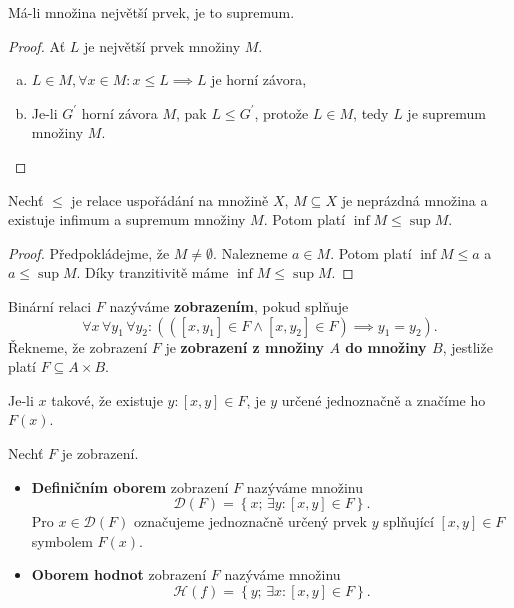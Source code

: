 \begin{poznamka}
	Má-li množina největší prvek, je to supremum.
\end{poznamka}

\begin{proof}
	Ať $L$ je největší prvek množiny $M$.
	\begin{enumerate}[(a)]
		\item $L\in M, \forall x\in M:x\leq L \implies L$ je horní závora,
		\item Je-li $G^\prime$ horní závora $M$, pak $L\leq G^\prime$, protože $L\in M$, tedy $L$ je supremum množiny $M$.
\end{enumerate}
\end{proof}

\begin{veta}\label{veta1.2}
Nechť $\le$ je relace uspořádání na množině $X$, $M\subseteq X$ je neprázdná množina
a existuje infimum a supremum množiny $M$. Potom platí
$\inf M \le \sup M.$
\end{veta}

\begin{proof}
	Předpokládejme, že $M\ne \emptyset$. Nalezneme $a\in M$. Potom platí $\inf M\leq a$ a $a\leq \sup M$. Díky tranzitivitě
	máme $\inf M \leq \sup M$.
\end{proof}

\begin{definice}
	Binární relaci $F$ nazýváme \textbf{zobrazením}, pokud splňuje
	$$
	    \forall x \, \forall y_1\, \forall y_2: \left( \left( \left [ x,y_1 \right ] \in F \land \left [ x,y_2 \right ] \in F \right ) \implies y_1 = y_2 \right ) .
	$$
	Řekneme, že zobrazení $F$ je \textbf{zobrazení z množiny $A$ do množiny $B$}, jestliže platí $F\subseteq A\times B$.
\end{definice}

\begin{oznaceni}
	Je-li $x$ takové, že existuje $y: \left [ x,y \right ]\in F $, je $y$ určené jednoznačně a značíme ho $F(x)$.
\end{oznaceni}

\begin{definice}
	Nechť $F$ je zobrazení.
	\begin{itemize}
		\item \textbf{Definičním oborem} zobrazení $F$ nazýváme množinu
		$$
		    \mathcal D(F)=\left \{ x; \, \exists y : \left [ x,y \right ] \in F \right \}.
		$$
		Pro $x \in \mathcal D(F)$ označujeme jednoznačně určený prvek $y$ splňující $\left [ x,y \right ] \in F$ symbolem $F(x)$.
		\item \textbf{Oborem hodnot} zobrazení $F$ nazýváme množinu
		$$
		    \mathcal H(f) = \left \{ y;\, \exists x:\left [ x,y \right ] \in F \right \}.
		$$
	\end{itemize}
\end{definice}

